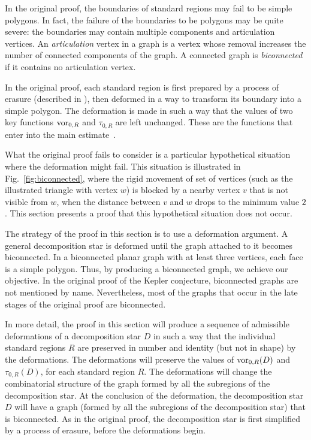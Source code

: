 \documentclass[11pt]{amsart}
\def\op#1{{\text{#1}}}
\def\text{\hbox}
\begin{document}
In the original proof, the boundaries of standard regions may fail to be
simple polygons.  In fact, the failure of the boundaries to be polygons may be quite
severe: the boundaries may contain multiple components and articulation vertices.
An {\it articulation}
vertex in a graph is a vertex whose removal increases the number of connected
components of the graph.  A connected graph is {\it biconnected} if it contains no
articulation vertex.

In the original proof, each standard region is first prepared by a process
of erasure (described in \cite[\S11.1]{Hales:2006:DCG:4}), then deformed in a way
to transform its boundary into a simple polygon.  The deformation
is made in such a way that the values of 
two key functions $\op{vor}_{0,R}$ and $\tau_{0,R}$ are left unchanged.
These are the functions that enter into the main estimate~\cite[Theorem~12.1]{Hales:2006:DCG:4}.

What the original proof fails to consider
is a particular hypothetical situation where the deformation might fail.  This situation is illustrated in Fig.~\ref{fig:biconnected}, where the rigid movement of set of vertices (such as the illustrated triangle with vertex $w$)
is blocked by a nearby vertex $v$ that is not visible from $w$, when the distance between $v$ and $w$ drops
to the minimum value $2$. This section presents a proof that this hypothetical situation does
not occur.

 The strategy of the proof in this section is to use a deformation argument.  A general decomposition star is deformed until the graph attached to it becomes biconnected.  In a biconnected planar graph with at least three vertices, each face is a simple polygon.  Thus, by producing a biconnected graph, we achieve our objective.  
In the original proof of the Kepler conjecture, biconnected graphs are not
mentioned by name.   Nevertheless, most of the graphs that occur in the late stages
of the original proof are biconnected.

In more detail, the proof in this section will produce a sequence of
admissible deformations of a decomposition star $D$ in such a way that
the individual standard regions $R$ are preserved in number and identity (but
not in shape) by the deformations.
The deformations will preserve the values of $\op{vor}_{0,R}(D)$ and
$\tau_{0,R}(D)$, for each standard region $R$. 
The deformations will change the combinatorial structure of the graph
formed by all the subregions of the decomposition star. 
At the conclusion of the deformation, the decomposition star $D$ will have
a graph (formed by all the subregions of the decomposition star) 
that is biconnected.  As in the original proof, the decomposition star
is first simplified by a process of erasure, before the deformations begin.
\end{document}
